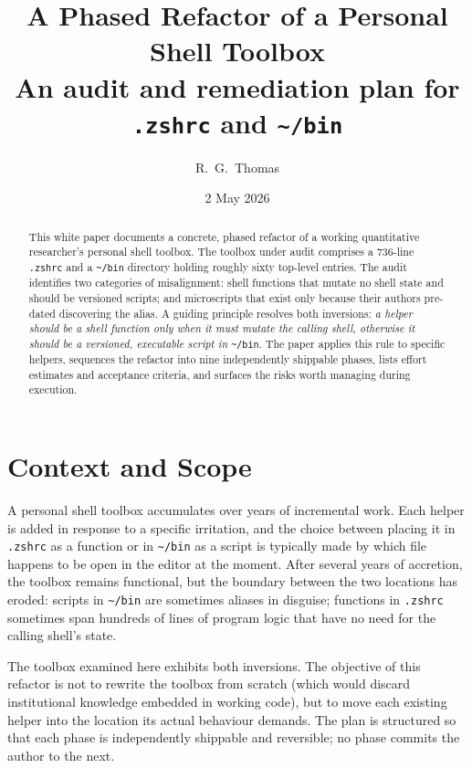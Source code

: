 \documentclass[11pt,letterpaper]{scrartcl}
\title{A Phased Refactor of a Personal Shell Toolbox\\
       \large An audit and remediation plan for
       \texttt{.zshrc} and \texttt{\textasciitilde/bin}}
\author{R.\ G.\ Thomas}
\date{2 May 2026}
\begin{document}
\maketitle

\begin{abstract}
\noindent
This white paper documents a concrete, phased refactor of a working
quantitative researcher's personal shell toolbox. The toolbox under
audit comprises a 736-line \texttt{.zshrc} and a
\texttt{\textasciitilde/bin} directory holding roughly sixty
top-level entries. The audit identifies two categories of
misalignment: shell functions that mutate no shell state and should
be versioned scripts; and microscripts that exist only because their
authors pre-dated discovering the alias. A guiding principle resolves
both inversions: \emph{a helper should be a shell function only when
it must mutate the calling shell, otherwise it should be a versioned,
executable script in} \texttt{\textasciitilde/bin}. The paper applies
this rule to specific helpers, sequences the refactor into nine
independently shippable phases, lists effort estimates and acceptance
criteria, and surfaces the risks worth managing during execution.
\end{abstract}

\tableofcontents

\section{Context and Scope}

A personal shell toolbox accumulates over years of incremental work.
Each helper is added in response to a specific irritation, and the
choice between placing it in \texttt{.zshrc} as a function or in
\texttt{\textasciitilde/bin} as a script is typically made by which
file happens to be open in the editor at the moment. After several
years of accretion, the toolbox remains functional, but the boundary
between the two locations has eroded: scripts in
\texttt{\textasciitilde/bin} are sometimes aliases in disguise;
functions in \texttt{.zshrc} sometimes span hundreds of lines of
program logic that have no need for the calling shell's state.

The toolbox examined here exhibits both inversions. The objective of
this refactor is not to rewrite the toolbox from scratch (which would
discard institutional knowledge embedded in working code), but to
move each existing helper into the location its actual behaviour
demands. The plan is structured so that each phase is independently
shippable and reversible; no phase commits the author to the next.
\end{document}
